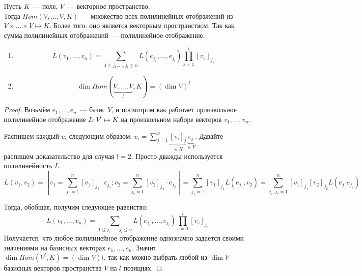 \begin{definition}
    Пусть $K$~--- поле, $V$~--- векторное пространство.\\ 
    Тогда $Hom(V,\dots, V,K)$~--- множество всех полилинейных отображений
    из $V\times\dots\times V\mapsto K$.
    Более того, оно является векторным пространством. Так как сумма полилинейных
    отображений~--- полилинейное отображение.
\end{definition}
\begin{statement}\leavevmode
    \begin{enumerate}
        \item \[
                L(v_1,\dots, v_n) = \sum\limits_{1\le j_1, \dots, j_l \le n}^{}{L(e_{j_1}, \dots, e_{j_l})\prod\limits_{s=1}^{l}{[v_s]_{j_s}}}
            \]
        \item \[
                \dim Hom(\underbrace{V,\dots, V}_{l}, K) = (\dim V)^l
            \]
    \end{enumerate}
\end{statement}
\begin{proof}
    Возьмём $e_1,\dots, e_n$~--- базис $V$, и посмотрим как работает произвольное
    полилинейное отображение $L: V^{l} \mapsto K$ на произвольном наборе векторов $v_1,\dots, v_n$.

    Распишем каждый $v_i$ следующим образом: $v_i = \sum\limits_{j=1}^{n}{\underbrace{[v_i]_j}_{\in K}\underbrace{e_j}_{\in V}}$.
    Давайте распишем доказательство для случая $l=2$. Просто дважды используется полилинейность $L$.
    \[
        L(v_1, v_2) = \left[v_1 = \sum\limits_{j_1=1}^{n}{[v_1]_{j_1}\cdot e_{j_1}};
        v_2 = \sum\limits_{j_2=1}^{n}{[v_2]_{j_2}\cdot e_{j_2}}\right]=
        \sum\limits_{j_1=1}^{n}{[v_1]_{j_1}L(e_{j_1}, v_2)} =
        \sum\limits_{j_1,j_2=1}^{n}{[v_1]_{j_1}[v_2]_{j_2}L(e_{j_1}e_{j_2})}
    \]

    Тогда, обобщая, получим следующее равенство:
    \begin{equation}
        L(v_1,\dots, v_n) = \sum\limits_{1\le j_1, \dots, j_l \le n}^{}{L(e_{j_1}, \dots, e_{j_l})\prod\limits_{s=1}^{l}{[v_s]_{j_s}}} \label{eq:7:1}
    \end{equation} 
    Получается, что любое полилинейное отображение однозначно задаётся своими значениями на базисных векторах $e_1,\dots, e_n$.
    Значит $\dim Hom(V^l, K) = (\dim V)l$, так как можно выбрать любой из $\dim V$ базисных векторов пространства $V$ на
    $l$ позициях.
\end{proof}
